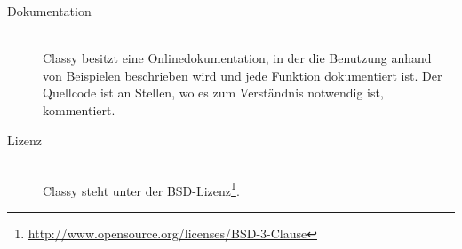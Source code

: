 \begin{description}
\item[Dokumentation] \hfill \\
Classy besitzt eine Onlinedokumentation, in der die Benutzung anhand von Beispielen beschrieben
wird und jede Funktion dokumentiert ist. Der Quellcode ist an Stellen, wo es zum Verständnis
notwendig ist, kommentiert.

\item[Lizenz] \hfill \\
Classy steht unter der
BSD-Lizenz\footnote{\href{http://www.opensource.org/licenses/BSD-3-Clause}{http://www.opensource.org/licenses/BSD-3-Clause}}.
\end{description}
